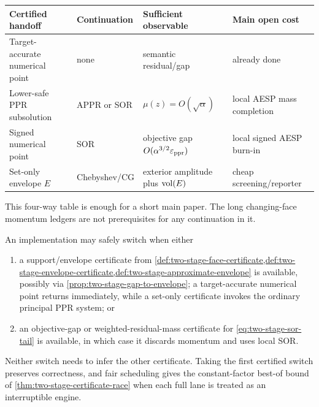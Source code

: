 \begin{center}
\small
\begin{tabularx}{\textwidth}{@{}p{}p{}p{}X@{}}
\toprule
Certified handoff & Continuation & Sufficient observable & Main open cost \\
\midrule
Target-accurate numerical point & none & semantic residual/gap & already done \\
Lower-safe PPR subsolution & APPR or SOR & $\mu(z)=O(\sqrt\alpha)$ & local AESP mass completion \\
Signed numerical point & SOR & objective gap $O(\alpha^{3/2}\varepsilon_{\mathrm{ppr}})$ & local signed AESP burn-in \\
Set-only envelope $E$ & Chebyshev/CG & exterior amplitude plus $\operatorname{vol}(E)$ & cheap screening/reporter \\
\bottomrule
\end{tabularx}
\end{center}

This four-way table is enough for a short main paper.  The long changing-face
momentum ledgers are not prerequisites for any continuation in it.

\begin{proposition}
\label{prop:two-stage-handoff-dichotomy}
An implementation may safely switch when either
\begin{enumerate}[label=(\roman*),leftmargin=2.2em]
\item a support/envelope certificate from
  \cref{def:two-stage-face-certificate,def:two-stage-envelope-certificate,def:two-stage-approximate-envelope}
  is available, possibly via \cref{prop:two-stage-gap-to-envelope}; a
  target-accurate numerical point returns immediately, while a set-only
  certificate invokes the ordinary principal PPR system; or
\item an objective-gap or weighted-residual-mass certificate for
  \cref{eq:two-stage-sor-tail} is available, in which case it discards
  momentum and uses local SOR.
\end{enumerate}
Neither switch needs to infer the other certificate.  Taking the first
certified switch preserves correctness, and fair scheduling gives the
constant-factor best-of bound of
\cref{thm:two-stage-certificate-race} when each full lane is treated as an
interruptible engine.
\end{proposition}
